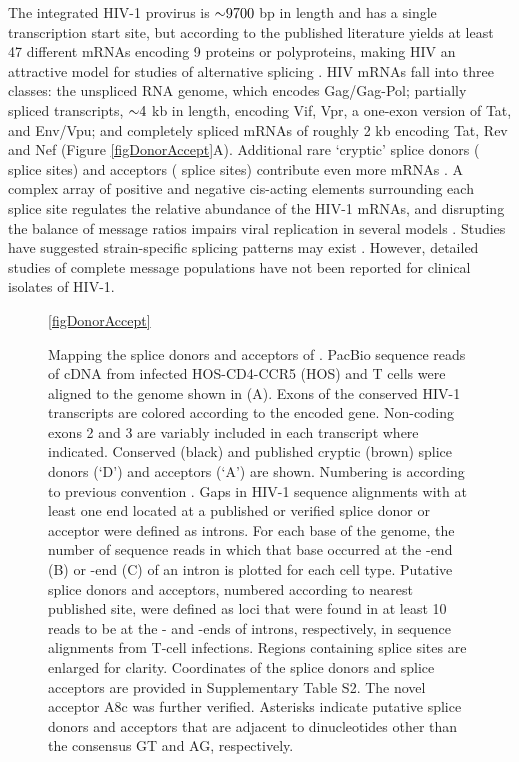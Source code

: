 \documentclass[../sherrill-Mix_thesis.tex]{subfiles}
\begin{document}
The integrated HIV-1 provirus is $\mathord{\sim}{}9700$ bp in length and has a single transcription start site, but according to the published literature yields at least 47 different mRNAs encoding 9 proteins or polyproteins, making HIV an attractive model for studies of alternative splicing \citep{Purcell1993}. HIV mRNAs fall into three classes: the unspliced RNA genome, which encodes Gag/Gag-Pol; partially spliced transcripts, $\mathord{\sim}{}4$ kb in length, encoding Vif, Vpr, a one-exon version of Tat, and Env/Vpu; and completely spliced mRNAs of roughly 2 kb encoding Tat, Rev and Nef (Figure \ref{figDonorAccept}A). Additional rare `cryptic' splice donors (\fivePrime{} splice sites) and acceptors (\threePrime{} splice sites) contribute even more mRNAs \citep{Benko1990,Carrera2010,Lutzelberger2006,Salfeld1990,Schwartz1990,Smith1992}. A complex array of positive and negative cis-acting elements surrounding each splice site regulates the relative abundance of the HIV-1 mRNAs, and disrupting the balance of message ratios impairs viral replication in several models \citep{Stoltzfus2009,Bakkour2007,Brass2008,Jablonski2009,Konig2008,Tranell2011,Zhou2008,Zhu2011}. Studies have suggested strain-specific splicing patterns may exist \citep{Purcell1993,Saltarelli1996,Delgado2012}. However, detailed studies of complete message populations have not been reported for clinical isolates of HIV-1. 

\begin{figure}
	\centering
	\caption[Mapping the splice donors and acceptors of \hivEight{}]{Mapping the splice donors and acceptors of \hivEight{}. PacBio sequence reads of \hivEight{} cDNA from infected HOS-CD4-CCR5 (HOS) and \cdFour{} T cells were aligned to the \hivEight{} genome shown in (A). Exons of the conserved HIV-1 transcripts are colored according to the encoded gene. Non-coding exons 2 and 3 are variably included in each transcript where indicated. Conserved (black) and published cryptic (brown) splice donors (`D') and acceptors (`A') are shown. Numbering is according to previous convention \citep{Purcell1993}. Gaps in HIV-1 sequence alignments with at least one end located at a published or verified splice donor or acceptor were defined as introns. For each base of the \hivEight{} genome, the number of sequence reads in which that base occurred at the \fivePrime{}-end (B) or \threePrime{}-end (C) of an intron is plotted for each cell type. Putative splice donors and acceptors, numbered according to nearest published site, were defined as loci that were found in at least 10 reads to be at the \fivePrime{}- and \threePrime{}-ends of introns, respectively, in sequence alignments from T-cell infections. Regions containing splice sites are enlarged for clarity. Coordinates of the splice donors and splice acceptors are provided in Supplementary Table S2. The novel acceptor A8c was further verified. Asterisks indicate putative splice donors and acceptors that are adjacent to dinucleotides other than the consensus GT and AG, respectively.}
	\ref{figDonorAccept}
\end{figure}
\end{document}
